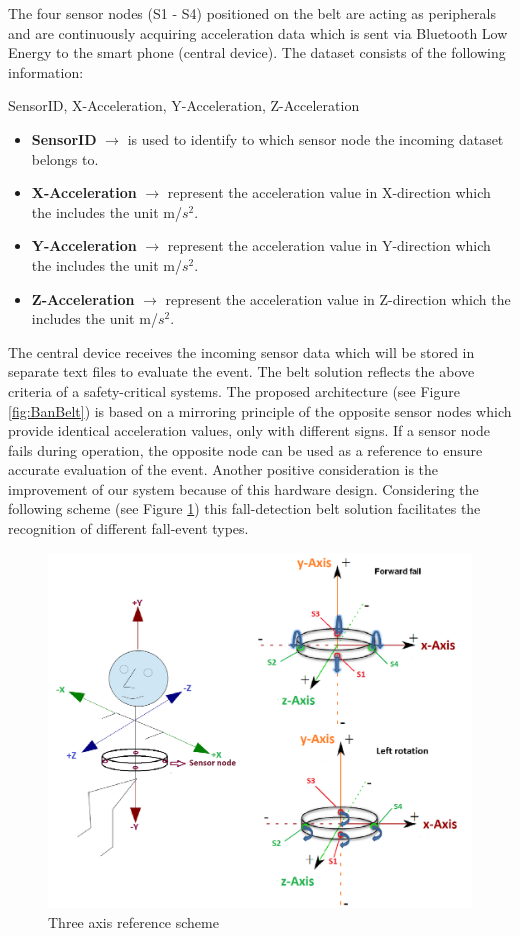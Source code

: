 \documentclass[review]{elsarticle}
\begin{document}
The four sensor nodes (S1 - S4) positioned on the belt are acting as peripherals and are continuously acquiring acceleration data which is sent via Bluetooth Low Energy to the smart phone (central device). The dataset consists of the following information: 
\begin{center}
 SensorID, X-Acceleration, Y-Acceleration, Z-Acceleration
\end{center}
\begin{itemize}
	\item \textbf{SensorID} $\rightarrow$ is used to identify to which sensor node the incoming dataset belongs to.
	\item \textbf{X-Acceleration} $\rightarrow$ represent the acceleration value in X-direction which the includes the unit m/$s^2$.
	\item \textbf{Y-Acceleration} $\rightarrow$ represent the acceleration value in Y-direction which the includes the unit m/$s^2$.
	\item \textbf{Z-Acceleration} $\rightarrow$ represent the acceleration value in Z-direction which the includes the unit m/$s^2$.
\end{itemize}
The central device receives the incoming sensor data which will be stored in separate text files to evaluate the event. 
The belt solution reflects the above criteria of a safety-critical systems. The proposed architecture (see Figure \ref{fig:BanBelt}) is based on a mirroring principle of the opposite sensor nodes which provide identical acceleration values, only with different signs. If a sensor node fails during operation, the opposite node can be used as a reference to ensure accurate evaluation of the event. Another positive consideration is the improvement of our system because of this hardware design. Considering the following scheme (see Figure \ref{fig:ReferenceScheme}) this fall-detection belt solution facilitates the recognition of different fall-event types. 

\begin{figure}[!ht]
	\centering
	\includegraphics[scale=0.28]{images/axis}
	\caption[Three axis reference scheme]{Three axis reference scheme \cite{LaBlunda.2016,LuigiMasterThesis}}
	\label{fig:ReferenceScheme}
\end{figure}
\end{document}
